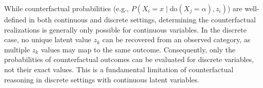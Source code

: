 While counterfactual probabilities (e.g., $P(X_i = x \mid \text{do}(X_j = \alpha), z_i)$) are well-defined in both continuous and discrete settings, determining the counterfactual realizations is generally only possible for continuous variables. In the discrete case, no unique latent value $z_k$ can be recovered from an observed category, as multiple $z_k$ values may map to the same outcome. Consequently, only the probabilities of counterfactual outcomes can be evaluated for discrete variables, not their exact values. This is a fundamental limitation of counterfactual reasoning in discrete settings with continuous latent variables.

% 
% 
% 
% 
% 
% 
